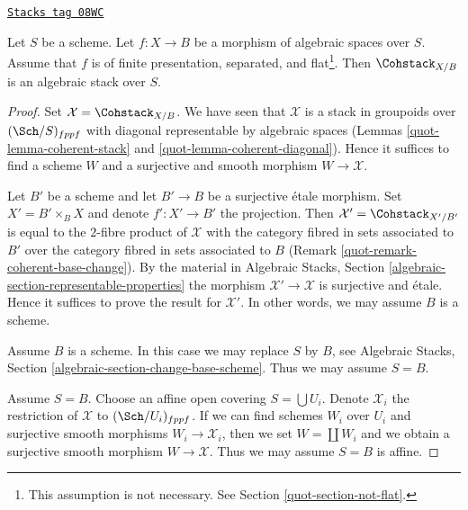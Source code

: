 \begin{theorem}

\label{quot-theorem-coherent-algebraic}
\href{https://stacks.math.columbia.edu/tag/08WC}{\texttt{Stacks tag 08WC}}

Let $S$ be a scheme. Let $f : X \to B$ be a morphism of algebraic spaces
over $S$. Assume that $f$ is of finite presentation, separated, and
flat\footnote{This assumption is not necessary. See
Section \ref{quot-section-not-flat}.}. Then $\Cohstack_{X/B}$ is
an algebraic stack over $S$.
\end{theorem}

\begin{proof}

Set $\mathcal{X} = \Cohstack_{X/B}$. We have seen that $\mathcal{X}$
is a stack in groupoids over $(\Sch/S)_{fppf}$ with diagonal representable
by algebraic spaces
(Lemmas \ref{quot-lemma-coherent-stack} and \ref{quot-lemma-coherent-diagonal}).
Hence it suffices to find a scheme $W$ and a surjective and smooth
morphism $W \to \mathcal{X}$.

\medskip\noindent
Let $B'$ be a scheme and let $B' \to B$ be a surjective \'etale morphism.
Set $X' = B' \times_B X$ and denote $f' : X' \to B'$ the projection.
Then $\mathcal{X}' = \Cohstack_{X'/B'}$ is equal to the $2$-fibre
product of $\mathcal{X}$ with the category fibred in sets
associated to $B'$ over the category fibred in sets associated to $B$
(Remark \ref{quot-remark-coherent-base-change}). By the material in
Algebraic Stacks, Section \ref{algebraic-section-representable-properties}
the morphism $\mathcal{X}' \to \mathcal{X}$ is surjective and \'etale.
Hence it suffices to prove the result for $\mathcal{X}'$.
In other words, we may assume $B$ is a scheme.

\medskip\noindent
Assume $B$ is a scheme. In this case we may replace $S$ by $B$, see
Algebraic Stacks, Section \ref{algebraic-section-change-base-scheme}.
Thus we may assume $S = B$.

\medskip\noindent
Assume $S = B$. Choose an affine open covering $S = \bigcup U_i$.
Denote $\mathcal{X}_i$ the restriction of $\mathcal{X}$ to
$(\Sch/U_i)_{fppf}$. If we can find schemes $W_i$ over $U_i$ and
surjective smooth morphisms $W_i \to \mathcal{X}_i$, then we
set $W = \coprod W_i$ and we obtain a surjective smooth morphism
$W \to \mathcal{X}$. Thus we may assume $S = B$ is affine.


\end{proof}
